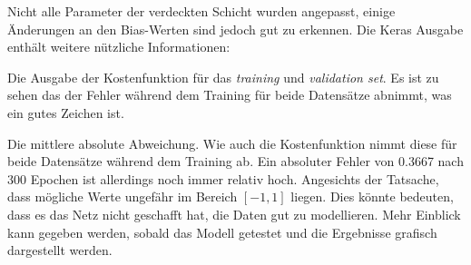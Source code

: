 Nicht alle Parameter der verdeckten Schicht wurden angepasst, einige
Änderungen an den Bias-Werten sind jedoch gut zu erkennen.
Die Keras Ausgabe enthält weitere nützliche Informationen:
\begin{description}[font=\normalfont, style=nextline]
\item[\pyconinline{loss} und \pyconinline{val_loss}]
Die Ausgabe der Kostenfunktion für das \textit{training} und \textit{validation set}.
Es ist zu sehen das der Fehler während dem Training für beide Datensätze abnimmt,
was ein gutes Zeichen ist.
\item[\pyconinline{mae} und \pyconinline{val_mae}]
Die mittlere absolute Abweichung. Wie auch die Kostenfunktion
nimmt diese für beide Datensätze während dem Training ab.
Ein absoluter Fehler von \num{0.3667}
nach 300 Epochen ist allerdings noch immer relativ hoch.
Angesichts der Tatsache, dass mögliche Werte ungefähr im
Bereich $[-1, 1]$ liegen.
Dies könnte bedeuten, dass es das Netz nicht geschafft hat, die Daten
gut zu modellieren. Mehr Einblick kann gegeben werden, sobald
das Modell getestet und die Ergebnisse grafisch dargestellt werden.
\end{description}

